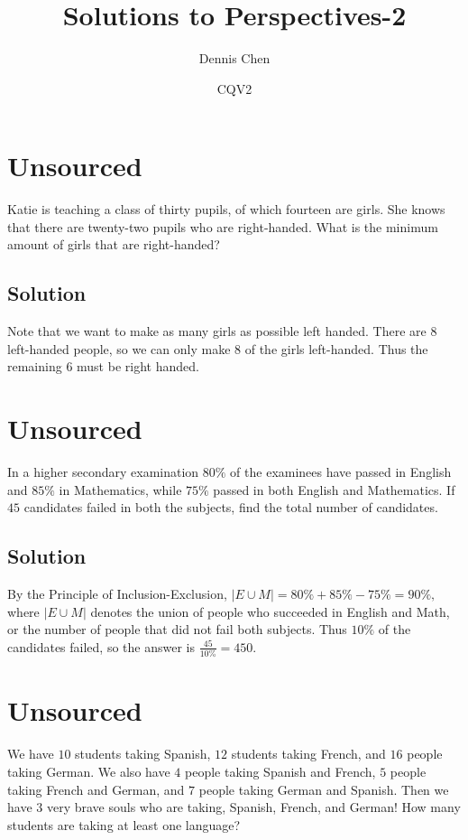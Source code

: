 \documentclass{article}
\title{Solutions to Perspectives-2}
\author{Dennis Chen}
\date{CQV2}
\begin{document}
\maketitle

\toc


\pagebreak\section{Unsourced}

Katie is teaching a class of thirty pupils, of which fourteen are girls. She knows that there are twenty-two pupils who are right-handed. What is the minimum amount of girls that are right-handed?

\subsection{Solution}
Note that we want to make as many girls as possible left handed. There are $8$ left-handed people, so we can only make $8$ of the girls left-handed. Thus the remaining $6$ must be right handed.

\pagebreak\section{Unsourced}
In a higher secondary examination $80\%$ of the examinees have passed in English and $85\%$ in Mathematics, while $75\%$ passed in both English and Mathematics. If $45$ candidates failed in both the subjects, find the total number of candidates.

\subsection{Solution}
By the Principle of Inclusion-Exclusion, $|E\cup M|=80\%+85\%-75\%=90\%,$ where $|E\cup M|$ denotes the union of people who succeeded in English and Math, or the number of people that did not fail both subjects. Thus $10\%$ of the candidates failed, so the answer is $\frac{45}{10\%}=450.$

\pagebreak\section{Unsourced}
We have $10$ students taking Spanish, $12$ students taking French, and $16$ people taking German. We also have $4$ people taking Spanish and French, $5$ people taking French and German, and $7$ people taking German and Spanish. Then we have $3$ very brave souls who are taking, Spanish, French, and German! How many students are taking at least one language?
\end{document}
